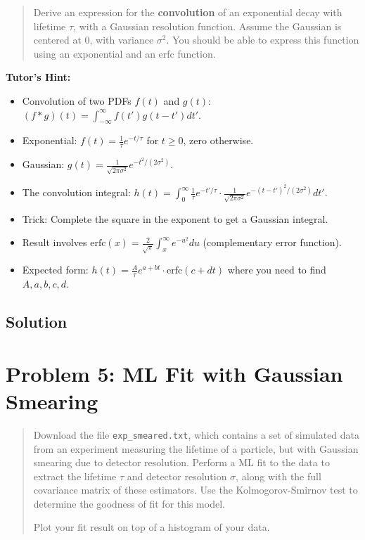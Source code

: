 \documentclass[11pt]{article}
\begin{document}
\begin{quote}
    Derive an expression for the \textbf{convolution} of an exponential decay with lifetime $\tau$, with a Gaussian resolution function. Assume the Gaussian is centered at 0, with variance $\sigma^2$. You should be able to express this function using an exponential and an erfc function.
\end{quote}

\textbf{Tutor's Hint:}
\begin{itemize}
    \item Convolution of two PDFs $f(t)$ and $g(t)$: $(f * g)(t) = \int_{-\infty}^{\infty} f(t') g(t - t') dt'$.
    \item Exponential: $f(t) = \frac{1}{\tau}e^{-t/\tau}$ for $t \geq 0$, zero otherwise.
    \item Gaussian: $g(t) = \frac{1}{\sqrt{2\pi\sigma^2}}e^{-t^2/(2\sigma^2)}$.
    \item The convolution integral: $h(t) = \int_{0}^{\infty} \frac{1}{\tau}e^{-t'/\tau} \cdot \frac{1}{\sqrt{2\pi\sigma^2}}e^{-(t-t')^2/(2\sigma^2)} dt'$.
    \item Trick: Complete the square in the exponent to get a Gaussian integral.
    \item Result involves $\text{erfc}(x) = \frac{2}{\sqrt{\pi}}\int_x^{\infty} e^{-u^2} du$ (complementary error function).
    \item Expected form: $h(t) = \frac{A}{\tau} e^{a + bt} \cdot \text{erfc}(c + dt)$ where you need to find $A, a, b, c, d$.
\end{itemize}

\subsection{Solution}


\section{Problem 5: ML Fit with Gaussian Smearing}

\begin{quote}
    Download the file \texttt{exp\_smeared.txt}, which contains a set of simulated data from an experiment measuring the lifetime of a particle, but with Gaussian smearing due to detector resolution. Perform a ML fit to the data to extract the lifetime $\tau$ and detector resolution $\sigma$, along with the full covariance matrix of these estimators. Use the Kolmogorov-Smirnov test to determine the goodness of fit for this model.

    Plot your fit result on top of a histogram of your data.
\end{quote}
\end{document}
